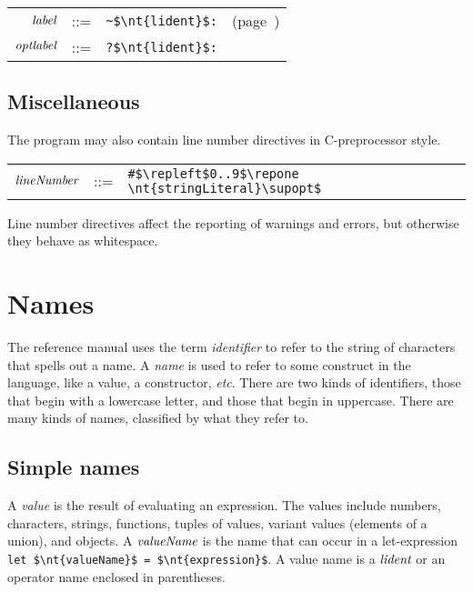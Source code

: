 \begin{center}
\begin{tabular}{rcll}
$\textit{\rmfamily label}$ & ::= & \hbox{\lstinline/~$\nt{lident}$:/} & (page~\pageref{literal:label})\\
$\textit{\rmfamily optlabel}$ & ::= & \hbox{\lstinline/?$\nt{lident}$:/}
\end{tabular}
\end{center}

\subsection{Miscellaneous}

The program may also contain line number directives in C-preprocessor style.

\begin{center}
\begin{tabular}{rcl}
$\textit{\rmfamily lineNumber}$ & ::= & \hbox{\lstinline/#$\repleft$0..9$\repone \nt{stringLiteral}\supopt$/}
\end{tabular}
\end{center}
%
Line number directives affect the reporting of warnings and errors, but otherwise they behave as
whitespace.

\section{Names}

The reference manual uses the term \emph{identifier} to refer to the string of characters that
spells out a name.  A \emph{name} is used to refer to some construct in the language, like a value,
a constructor, \emph{etc}.  There are two kinds of identifiers, those that begin with a lowercase
letter, and those that begin in uppercase.  There are many kinds of names, classified by what they
refer to.

\subsection{Simple names}

A \emph{value} is the result of evaluating an expression.  The values include numbers, characters,
strings, functions, tuples of values, variant values (elements of a union), and objects.  A
$\textit{\rmfamily valueName}$ is the name that can occur in a let-expression
%
\hbox{\lstinline/let $\nt{valueName}$ = $\nt{expression}$/}.  A value name is a $\textit{\rmfamily lident}$ or
an operator name enclosed in parentheses.

